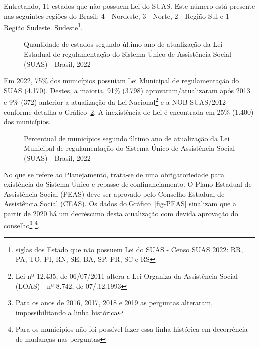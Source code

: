 \documentclass[
  letterpaper,
  DIV=11,
  numbers=noendperiod]{scrreprt}
\begin{document}
Entretando, 11 estados que não possuem Lei do SUAS. Este número está
presente nas seguintes regiões do Brasil: 4 - Nordeste, 3 - Norte, 2 -
Região Sul e 1 - Região Sudeste. Sudeste\footnote{siglas dos Estado que
  não possuem Lei do SUAS - Censo SUAS 2022: RR, PA, TO, PI, RN, SE, BA,
  SP, PR, SC e RS}.

\begin{figure}


\caption{\label{fig-estados-atualizacao-lei}Quantidade de estados
segundo último ano de atualização da Lei Estadual de regulamentação do
Sistema Único de Assistência Social (SUAS) - Brasil, 2022}

\end{figure}%

Em 2022, 75\% dos municípios possuíam Lei Municipal de regulamentação do
SUAS (4.170). Destes, a maioria, 91\% (3.798) aprovaram/atualizaram após
2013 e 9\% (372) anterior a atualização da Lei Nacional\footnote{Lei nº
  12.435, de 06/07/2011 altera a Lei Organiza da Assistência Social
  (LOAS) - nº 8.742, de 07/.12.1993} e a NOB SUAS/2012 conforme detalha
o Gráfico~\ref{fig-municipios-atualizacao-lei}. A inexistência de Lei é
encontrada em 25\% (1.400) dos municípios.

\begin{figure}


\caption{\label{fig-municipios-atualizacao-lei}Percentual de municípios
segundo último ano de atualização da Lei Municipal de regulamentação do
Sistema Único de Assistência Social (SUAS) - Brasil, 2022}

\end{figure}%

No que se refere ao Planejamento, trata-se de uma obrigatoriedade para
existência do Sistema Único e repasse de confinanciamento. O Plano
Estadual de Assistência Social (PEAS) deve ser aprovado pelo Conselho
Estadual de Assistência Social (CEAS). Os dados do
Gráfico~\ref{fig-PEAS} sinalizam que a partir de 2020 há um decréscimo
desta atualização com devida aprovação do conselho\footnote{Para os anos
  de 2016, 2017, 2018 e 2019 as perguntas alteraram, impossibilitando a
  linha histórica} \footnote{Para os municípios não foi possível fazer
  essa linha histórica em decorrência de mudanças nas perguntas}.
\end{document}
